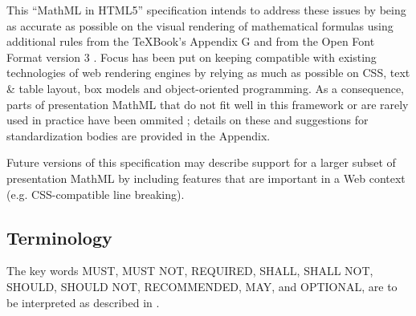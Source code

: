 This ``MathML in HTML5'' specification intends to address these issues by being
as accurate as
possible on the visual rendering of mathematical formulas using additional
rules from the \TeX Book's Appendix G \cite{TeXBook} and from
the Open Font Format version 3 \cite{OpenFontFormat3}.
Focus has been put on keeping compatible with existing technologies of web
rendering engines \cite{HTML5} by relying as much as possible on CSS, text \&
table layout, box models and object-oriented programming.
As a consequence, parts of presentation MathML
that do not fit well in this framework or are rarely used in practice
have been ommited ; details on these and suggestions for standardization bodies
are provided in the Appendix.

Future versions of this specification may describe support for a larger subset
of presentation MathML by including features that are important in a Web context
(e.g. CSS-compatible line breaking).

\subsection{Terminology}

The key words MUST, MUST NOT, REQUIRED, SHALL, SHALL NOT, SHOULD, SHOULD NOT, RECOMMENDED, MAY, and OPTIONAL, are to be interpreted as described in \cite{IETF RFC 2119}.
